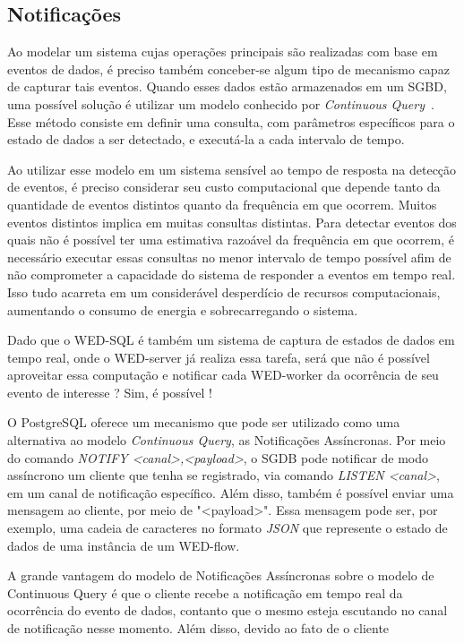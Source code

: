 \documentclass[conference]{IEEEtran}
\begin{document}
\subsection{Notificações}
Ao modelar um sistema cujas operações principais são realizadas com base em eventos de dados, é preciso também conceber-se
algum tipo de mecanismo capaz de capturar tais eventos. Quando esses dados estão armazenados em um SGBD, uma possível 
solução é utilizar um modelo conhecido por \emph{Continuous Query}~\cite{CQ}. Esse método consiste em definir 
uma consulta, com parâmetros específicos para o estado de dados a ser detectado, e executá-la a cada intervalo de tempo.
\par Ao utilizar esse modelo em um sistema sensível ao tempo de resposta na detecção de eventos, é preciso considerar seu
custo computacional que depende tanto da quantidade de eventos distintos quanto da frequência em que ocorrem. Muitos
eventos distintos implica em muitas consultas distintas. Para detectar eventos dos quais não é possível ter uma estimativa razoável
da frequência em que ocorrem, é necessário executar essas consultas no menor intervalo de tempo possível afim de não comprometer  
a capacidade do sistema de responder a eventos em tempo real. Isso tudo acarreta em um considerável desperdício de recursos
computacionais, aumentando o consumo de energia e sobrecarregando o sistema.
\par Dado que o WED-SQL é também um sistema de captura de estados de dados em tempo real, onde o WED-server já realiza
essa tarefa, será que não é possível aproveitar essa computação e notificar cada WED-worker da ocorrência de seu evento
de interesse ? Sim, é possível ! 
\par O PostgreSQL oferece um mecanismo que pode ser utilizado como uma alternativa ao modelo \emph{Continuous Query}, as Notificações Assíncronas.
Por meio do comando \emph{NOTIFY <canal>,<payload>}, o SGDB pode notificar de modo assíncrono um cliente que tenha se registrado, via comando 
\emph{LISTEN <canal>}, em um canal de notificação específico. Além disso, também é possível enviar uma mensagem ao cliente, por meio de "<payload>". Essa mensagem pode
ser, por exemplo, uma cadeia de caracteres no formato \emph{JSON} que represente o estado de dados de uma instância de um WED-flow.
\par A grande vantagem do modelo de Notificações Assíncronas sobre o modelo de Continuous Query é que o cliente recebe a notificação em tempo real
da ocorrência do evento de dados, contanto que o mesmo esteja escutando no canal de notificação nesse momento. Além disso, devido ao fato de o cliente
\end{document}
